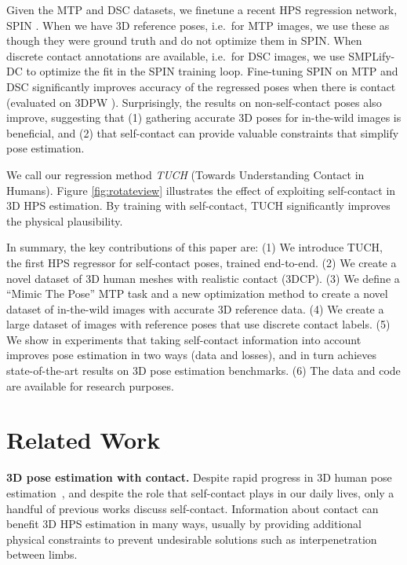 \documentclass[final]{cvpr}
\renewcommand{\ie}{i.e.\xspace}
\newcommand{\mtp}{\mbox{MTP}\xspace}
\newcommand{\smplifyxdc}{\mbox{SMPLify-DC}\xspace}
\theoremstyle{definition}
\begin{document}
Given the MTP and DSC datasets, we finetune a recent HPS regression network, SPIN \cite{kolotouros2019learning}.
When we have 3D reference poses, \ie~for MTP images, we use these as though they were ground truth and do not optimize them in SPIN. 
When discrete contact annotations are available, \ie~for DSC images, we use \smplifyxdc to optimize the fit in the SPIN training loop.
Fine-tuning SPIN on MTP and DSC significantly improves accuracy of the regressed poses when there is contact (evaluated on 3DPW \cite{vonMarcard2018}).
Surprisingly, the results on non-self-contact poses also improve, suggesting that (1) gathering accurate 3D poses for in-the-wild images is beneficial, and (2) that self-contact can provide valuable constraints that simplify pose estimation.

We call our regression method {\em TUCH} (Towards Understanding Contact in Humans).
Figure \ref{fig:rotateview} illustrates the effect of exploiting self-contact in 3D HPS estimation. 
By training with self-contact, TUCH significantly improves the physical plausibility.

In summary, the key contributions of this paper are:
(1) We introduce TUCH, the first HPS regressor for self-contact poses, trained end-to-end. 
(2) We create a novel dataset of 3D human meshes with realistic contact (3DCP).
(3) We define a ``Mimic The Pose''  {\mtp} task and a new optimization method to create a novel dataset of in-the-wild images with accurate 3D reference data.
(4) We create a large dataset of images with reference poses that use discrete contact labels.
(5) We show in experiments that taking self-contact information into account improves pose estimation in two ways (data and losses), and in turn achieves state-of-the-art results on 3D pose estimation benchmarks.
(6) The data and code are available for research purposes. 	\section{Related Work}

{\bf 3D pose estimation with contact.}
Despite rapid progress in  3D human pose estimation~\cite{Joo2018totalcapture,kanazawa2018end,kolotouros2019learning,mehta2019xnect,SMPL-X:2019,sarafianos20163d,xiang2019monocular}, 
and despite the role that self-contact plays in our daily lives, only a handful of previous works discuss self-contact. 
Information about contact can benefit 3D HPS estimation in many ways, usually by providing additional physical constraints to prevent undesirable solutions such as interpenetration between limbs.
\end{document}
